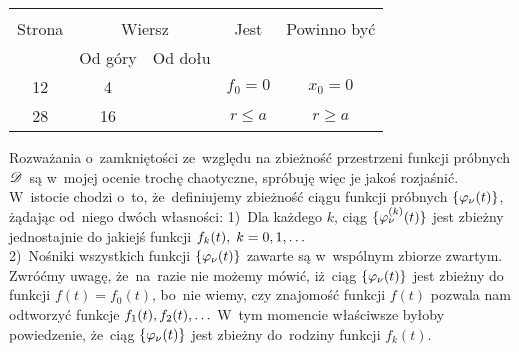 \documentclass[a4paper,11pt]{article}
\begin{document}


\begin{center}
  \begin{tabular}{|c|c|c|c|c|}
    \hline
    & \multicolumn{2}{c|}{} & & \\
    Strona & \multicolumn{2}{c|}{Wiersz} & Jest
                              & Powinno być \\ \cline{2-3}
    & Od góry & Od dołu & & \\
    \hline
    12  &  4 & & $f_{ 0 } = 0$ & $x_{ 0 } = 0$ \\
    28  & 16 & & $r \leq a$ & $r \geq a$ \\
    \hline
  \end{tabular}
\end{center}

\vspace{\spaceTwo}



\newpage
{}



\noi {}

\vspace{\spaceFour}


\start {} Rozważania o~zamkniętości ze~względu na zbieżność
przestrzeni funkcji próbnych $\mathcal{D}$~są w~mojej ocenie trochę
chaotyczne, spróbuję więc je jakoś rozjaśnić. W~istocie chodzi o~to,
że~definiujemy zbieżność ciągu funkcji próbnych
$\{  \varphi_{ \nu }( t )  \}$, żądając od~niego dwóch własności:
1)~Dla każdego $k$, ciąg $\{  \varphi_{ \nu }^{ ( k ) }( t )  \}$ jest
zbieżny jednostajnie do jakiejś funkcji
$f_{ k }( t ), \; k = 0, 1, \ldots$ \\
2)~Nośniki wszystkich funkcji $\{  \varphi_{ \nu }( t )  \}$ zawarte są
w~wspólnym zbiorze zwartym. \\
Zwróćmy uwagę, że~na~razie nie możemy mówić, iż~ciąg
$\{  \varphi_{ \nu }( t )  \}$ jest zbieżny do funkcji
$f( t ) = f_{ 0 }( t )$, bo~nie wiemy, czy znajomość funkcji $f( t )$
pozwala nam odtworzyć funkcje $f_{ 1 }( t ), f_{ 2 }( t ), \ldots$ W~tym
momencie właściwsze byłoby powiedzenie, że~ciąg
$\{  \varphi_{ \nu }( t )  \}$ jest zbieżny do~rodziny funkcji
$f_{ k }( t )$.
\end{document}
